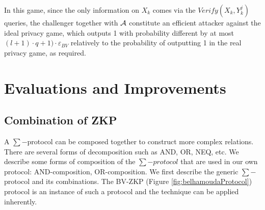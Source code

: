 In this game, since the only information on $X_k$ comes via the $Verify(X_k,Y_k^{j})$ queries, the challenger together with $\mathcal{A}$ constitute an efficient attacker against the ideal privacy game, which outputs 1 with probability different by at most $(l+1) \cdot q + 1) \cdot \varepsilon_{BV}$ relatively to the probability of outputting 1 in the real privacy game, as required.

\section{Evaluations and Improvements}
\label{sec:evaluation}


\subsection{Combination of ZKP}
\label{sec:combination-zkp}
A $\sum-$protocol can be composed together to construct more complex relations.
There are several forms of decomposition such as AND, OR, NEQ, etc.  We describe
some forms of composition of the \(\sum-protocol\) that are used in our own protocol:
AND-composition, OR-composition. We first describe the generic \(\sum-\)protocol
and its combinations. The BV-ZKP (Figure \ref{fig:belhamoudaProtocol}) protocol
is an instance of such a protocol and the technique can be applied inherently.
